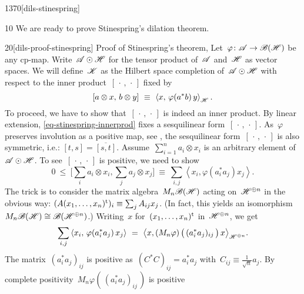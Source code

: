 \begin{parsec}{1370}[dils-stinespring]%
\begin{point}{10}%
We are ready to prove Stinespring's dilation theorem.
\begin{point}{20}[dils-proof-stinespring]{%
    Proof of Stinespring's theorem, }%
Let~$\varphi\colon \mathscr{A} \to \mathscr{B}(\mathscr{H})$
    be any cp-map.
Write~$\mathscr{A} \odot \mathscr{H}$ for the tensor product of~$\mathscr{A}$ and~$\mathscr{H}$
    as vector spaces.
We will define~$\mathscr{K}$ as the Hilbert space completion
    of~$\mathscr{A} \odot \mathscr{H}$ with respect to the inner
    product~$[\,\cdot\,,\,\cdot\,]$
    fixed by
\begin{equation}\label{eq-stinespring-innerprod}
    [a\otimes x,\, b \otimes y] \ \equiv\  \left<x, \,\varphi(a^*b)\, y\right>_{\mathscr{H}}.
\end{equation}
To proceed, we have to show that~$[\,\cdot\,,\,\cdot\,]$
    is indeed an inner product.
By linear extension, \eqref{eq-stinespring-innerprod}
    fixes a sesquilinear form~$[\,\cdot\,,\,\cdot\,]$.
As~$\varphi$ preserves involution as a positive map,
see ,
    the sesquilinear form~$[\,\cdot\,,\,\cdot\,]$
is also symmetric, i.e.: $[t,s]=\overline{[s,t]}$.
    Assume~$\sum^n_{i=1} a_i\otimes x_i$
is an arbitrary element of~$\mathscr{A} \odot \mathscr{H}$.
To see~$[\,\cdot\,,\,\cdot\,]$ is positive,
we need to show
\begin{equation*}
    0 \ \leq\  \bigl[\sum_i a_i\otimes x_i, \sum_j a_j\otimes x_j\bigr]
        \ \equiv\  \sum_{i,j} \left< x_i, \varphi(a_i^*a_j) x_j \right>.
\end{equation*}
The trick is to consider the matrix algebra~$M_n\mathscr{B}(\mathscr{H})$
acting on~$\mathscr{H}^{\oplus n}$ in the obvious way:
$(A (x_1,\ldots,x_n)^{\mathrm{t}})_i \equiv \sum_j A_{ij} x_j$.
(In fact, this yields an
    isomorphism~$M_n\mathscr{B}(\mathscr{H}) \cong \mathscr{B}(\mathscr{H}^{\oplus n})$.)
Writing~$x$ for~$(x_1,\ldots,x_n)^{\mathrm{t}}$ in~$\mathscr{H}^{\oplus n}$,
    we get
\begin{equation}\label{eq-stinespring-norm-tensor}
    \sum_{i,j} \left< x_i, \,\varphi(a_i^*a_j)\, x_j \right>
    \ =\  \bigl<
    x,
    (M_n\varphi) \,\bigl(\, (a_i^*a_j)_{ij} \, \bigr)\,
    x \bigr>_{\mathscr{H}^{\oplus n}}.
\end{equation}
The matrix~$(a_i^*a_j)_{ij}$
is positive as~$(C^*C)_{ij} = a_i^*a_j$
    with~$C_{ij} \equiv \frac{1}{\sqrt{n}} a_j$.
    By complete positivity~$M_n\varphi(\,(a_i^*a_j)_{ij}\,)$ is positive

\end{point}
\end{point}
\end{parsec}
